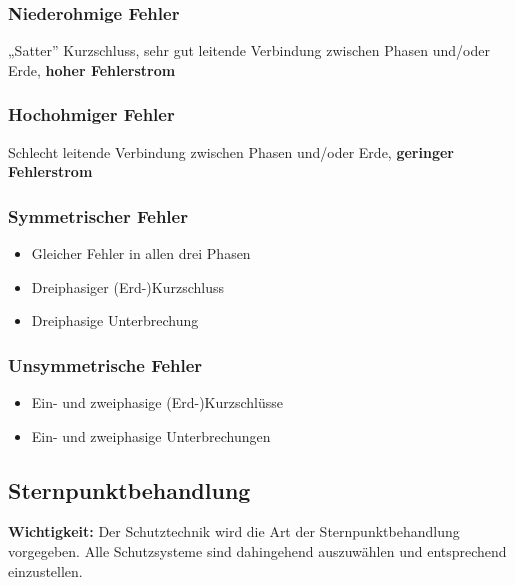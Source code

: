   \begin{minipage}[t]{0.49\columnwidth}
    \subsubsection{Niederohmige Fehler}
      „Satter” Kurzschluss, sehr gut leitende Verbindung zwischen Phasen und/oder Erde, \textbf{hoher Fehlerstrom}
  \end{minipage}%
  \hfill
  \begin{minipage}[t]{0.49\columnwidth}
    \subsubsection{Hochohmiger Fehler}
      Schlecht leitende Verbindung zwischen Phasen und/oder Erde, \textbf{geringer Fehlerstrom}
  \end{minipage}

  \begin{minipage}[t]{0.49\columnwidth}
    \subsubsection{Symmetrischer Fehler}
      \begin{itemize}
        \item Gleicher Fehler in allen drei Phasen
        \item Dreiphasiger (Erd-)Kurzschluss
        \item Dreiphasige Unterbrechung
      \end{itemize}
  \end{minipage}%
  \hfill
  \begin{minipage}[t]{0.49\columnwidth}
    \subsubsection{Unsymmetrische Fehler}
      \begin{itemize}
        \item Ein- und zweiphasige (Erd-)Kurzschlüsse
        \item Ein- und zweiphasige Unterbrechungen
      \end{itemize}
  \end{minipage}

\subsection{Sternpunktbehandlung}
  \textbf{Wichtigkeit:} Der Schutztechnik wird die Art der Sternpunktbehandlung vorgegeben. Alle Schutzsysteme sind dahingehend auszuwählen und entsprechend einzustellen.

